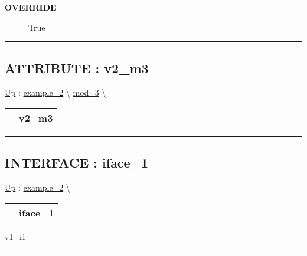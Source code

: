 \par

\par
\begin{description}
\item [\textbf{OVERRIDE}] True
\end{description}

\rule{\linewidth}{0.5pt}
\subsection*{ATTRIBUTE : v2\_m3}
\hypertarget{ecldoc:intest.in1intest.example_2.mod_3.v2_m3}{}
\hyperlink{ecldoc:intest.in1intest.example_2.mod_3}{Up} :
\hspace{0pt} \hyperlink{ecldoc:intest.in1intest.example_2}{example_2} \textbackslash 
\hspace{0pt} \hyperlink{ecldoc:intest.in1intest.example_2.mod_3}{mod_3} \textbackslash 

{\renewcommand{\arraystretch}{1.5}
\begin{tabularx}{\textwidth}{|>{\raggedright\arraybackslash}l|X|}
\hline
\hspace{0pt} & v2\_m3 \\
\hline
\end{tabularx}
}

\par


\rule{\linewidth}{0.5pt}


\subsection*{INTERFACE : iface\_1}
\hypertarget{ecldoc:intest.in1intest.example_2.iface_1}{}
\hyperlink{ecldoc:intest.in1intest.example_2}{Up} :
\hspace{0pt} \hyperlink{ecldoc:intest.in1intest.example_2}{example_2} \textbackslash 

{\renewcommand{\arraystretch}{1.5}
\begin{tabularx}{\textwidth}{|>{\raggedright\arraybackslash}l|X|}
\hline
\hspace{0pt} & iface\_1 \\
\hline
\end{tabularx}
}

\par


\hyperlink{ecldoc:intest.in1intest.example_2.iface_1.v1_i1}{v1\_i1}  |

\rule{\linewidth}{0.5pt}


